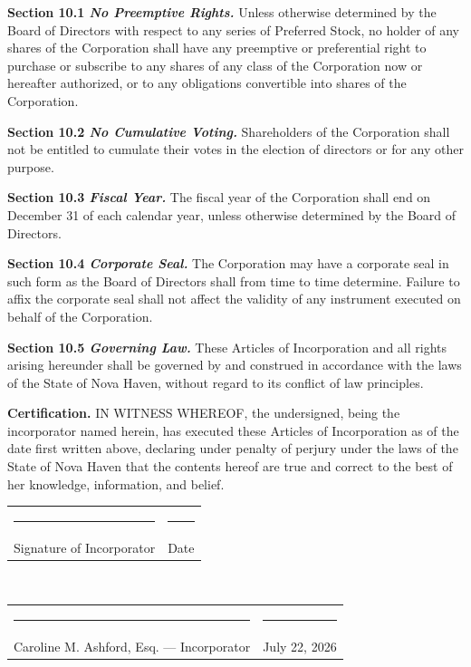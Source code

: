 \documentclass[12pt,a4paper]{scrartcl}
\makeatletter
\newcommand{\sectionlabel}[1]{%
  \noindent\textbf{\color{NavyDeep}#1}\quad%
}
\newcommand{\sigline}[2]{%
  \noindent\begin{tabular}{@{}p{7cm}@{\hspace{1.5cm}}p{5.5cm}@{}}%
    \rule{7cm}{0.4pt} & \rule{5.5cm}{0.4pt}\\[-2pt]%
    {\small\color{SlateGray}#1} & {\small\color{SlateGray}#2}\\%
  \end{tabular}%
}
\makeatother
\begin{document}
\sectionlabel{Section 10.1 \textit{No Preemptive Rights.}}Unless otherwise determined by the
Board of Directors with respect to any series of Preferred Stock, no holder of any shares of
the Corporation shall have any preemptive or preferential right to purchase or subscribe to
any shares of any class of the Corporation now or hereafter authorized, or to any obligations
convertible into shares of the Corporation.

\sectionlabel{Section 10.2 \textit{No Cumulative Voting.}}Shareholders of the Corporation
shall not be entitled to cumulate their votes in the election of directors or for any other
purpose.

\sectionlabel{Section 10.3 \textit{Fiscal Year.}}The fiscal year of the Corporation shall end
on December 31 of each calendar year, unless otherwise determined by the Board of Directors.

\sectionlabel{Section 10.4 \textit{Corporate Seal.}}The Corporation may have a corporate seal
in such form as the Board of Directors shall from time to time determine. Failure to affix the
corporate seal shall not affect the validity of any instrument executed on behalf of the
Corporation.

\sectionlabel{Section 10.5 \textit{Governing Law.}}These Articles of Incorporation and all
rights arising hereunder shall be governed by and construed in accordance with the laws of
the State of Nova Haven, without regard to its conflict of law principles.

\bigskip

\begin{tcolorbox}[notebox]
\noindent\textbf{\color{NavyDeep}\faPen\enspace Certification.}\enspace
IN WITNESS WHEREOF, the undersigned, being the incorporator named herein, has executed these
Articles of Incorporation as of the date first written above, declaring under penalty of
perjury under the laws of the State of Nova Haven that the contents hereof are true and correct
to the best of her knowledge, information, and belief.
\end{tcolorbox}

\vspace{20pt}

\begin{tcolorbox}[signbox, title={\color{NavyDeep}\bfseries Incorporator Signature}]
\vspace{8pt}
\sigline{Signature of Incorporator}{Date}
\vspace{18pt}\\
\sigline{Caroline M. Ashford, Esq. --- Incorporator}{July 22, 2026}
\vspace{10pt}
\end{tcolorbox}
\end{document}

